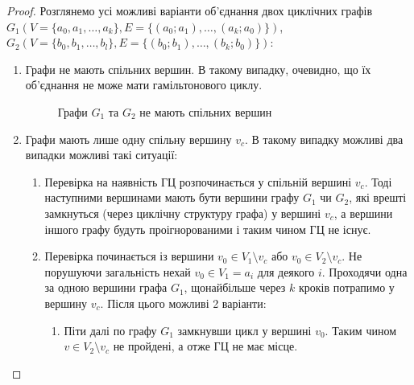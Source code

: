 \documentclass[a4paper,14pt,ukrainian]{extarticle}
\begin{document}
    \begin{proof}
        Розглянемо усі можливі варіанти об’єднання двох циклічних графів $G_1(V=\lbrace a_0, a_1, \dots, a_k \rbrace ,E= \lbrace (a_0; a_1), \dots, (a_k; a_0) \rbrace)$, $G_2(V= \lbrace b_0, b_1, \dots, b_l \rbrace, E= \lbrace (b_0; b_1), \dots, (b_k; b_0) \rbrace )$:
        \begin{enumerate}
            \item Графи не мають спільних вершин. В такому випадку, очевидно, що їх об’єднання не може мати гамільтонового циклу.
                \begin{figure}[h]
                    \caption{Графи $G_1$ та $G_2$ не мають спільних вершин}
                    \centering
                \end{figure}
            \item Графи мають лише одну спільну вершину $v_c$. В такому випадку можливі два випадки можливі такі ситуації:
                \begin{enumerate}
                    \item Перевірка на наявність ГЦ розпочинається у спільній вершині $v_c$. Тоді наступними вершинами мають бути вершини графу $G_1$ чи $G_2$, які врешті замкнуться (через циклічну структуру графа) у вершині $v_c$, а вершини іншого графу будуть проігнорованими і таким чином ГЦ не існує.
                    \item Перевірка починається із вершини $v_0 \in V_1 \setminus v_c$ або $v_0 \in V_2 \setminus v_c$. Не порушуючи загальність нехай $v_0 \in V_1 = a_i$ для деякого $i$.
                        Проходячи одна за одною вершини графа $G_1$, щонайбільше через $k$ кроків потрапимо у вершину $v_c$. Після цього можливі 2 варіанти:
                        \begin{enumerate}
                            \item Піти далі по графу $G_1$ замкнувши цикл у вершині $v_0$. Таким чином $v \in V_2 \setminus v_c$ не пройдені, а отже ГЦ не має місце.

\end{enumerate}
\end{enumerate}
\end{enumerate}
\end{proof}
\end{document}
